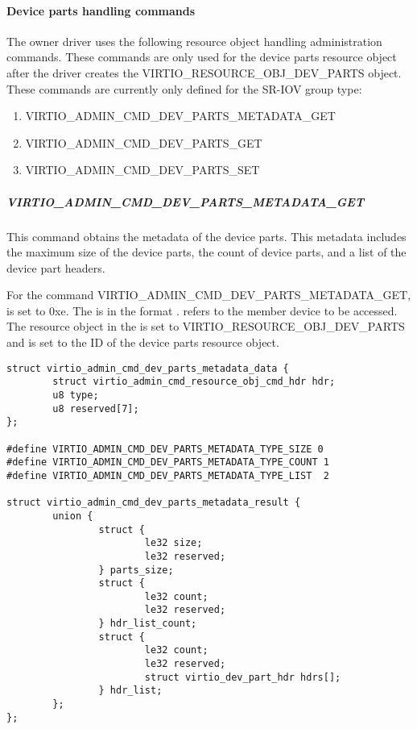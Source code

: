 \paragraph{Device parts handling commands}\label{par:Basic Facilities of a Virtio Device / Device groups / Group administration commands / Device parts / Device parts handling commands}

The owner driver uses the following resource object handling administration
commands. These commands are only used for the device parts resource
object after the driver creates the VIRTIO_RESOURCE_OBJ_DEV_PARTS object.
These commands are currently only defined for the SR-IOV group type:

\begin{enumerate}
\item VIRTIO_ADMIN_CMD_DEV_PARTS_METADATA_GET
\item VIRTIO_ADMIN_CMD_DEV_PARTS_GET
\item VIRTIO_ADMIN_CMD_DEV_PARTS_SET
\end{enumerate}

\subparagraph{VIRTIO_ADMIN_CMD_DEV_PARTS_METADATA_GET}
\label{par:Basic Facilities of a Virtio Device / Device groups / Group administration commands / Device parts / Device parts handling commands / VIRTIO-ADMIN-CMD-DEV-PARTS-METADATA-GET}

This command obtains the metadata of the device parts. This metadata includes
the maximum size of the device parts, the count of device parts, and a list of
the device part headers.

For the command VIRTIO_ADMIN_CMD_DEV_PARTS_METADATA_GET,  is set
to 0xe. The  is in the format
.
 refers to the member device to be accessed.
The resource object  in the  is set to
VIRTIO_RESOURCE_OBJ_DEV_PARTS and  is set to the ID of the
device parts resource object.

\begin{lstlisting}
struct virtio_admin_cmd_dev_parts_metadata_data {
        struct virtio_admin_cmd_resource_obj_cmd_hdr hdr;
        u8 type;
        u8 reserved[7];
};

#define VIRTIO_ADMIN_CMD_DEV_PARTS_METADATA_TYPE_SIZE 0
#define VIRTIO_ADMIN_CMD_DEV_PARTS_METADATA_TYPE_COUNT 1
#define VIRTIO_ADMIN_CMD_DEV_PARTS_METADATA_TYPE_LIST  2

struct virtio_admin_cmd_dev_parts_metadata_result {
        union {
                struct {
                        le32 size;
                        le32 reserved;
                } parts_size;
                struct {
                        le32 count;
                        le32 reserved;
                } hdr_list_count;
                struct {
                        le32 count;
                        le32 reserved;
                        struct virtio_dev_part_hdr hdrs[];
                } hdr_list;
        };
};
\end{lstlisting}

